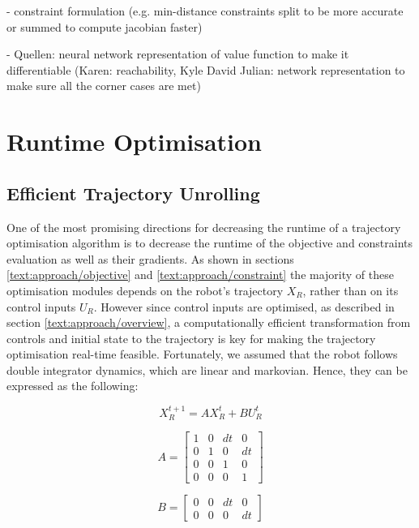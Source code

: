 - constraint formulation (e.g. min-distance constraints split to be more accurate or summed to compute jacobian faster)

- Quellen: neural network representation of value function to make it differentiable (Karen: reachability, Kyle David Julian: network representation to make sure all the corner cases are met)

\section{Runtime Optimisation}
\label{text:approach/runtime}

\subsection{Efficient Trajectory Unrolling}
\label{text:approach/runtime/unrolling}
One of the most promising directions for decreasing the runtime of a trajectory optimisation algorithm is to decrease the runtime of the objective and constraints evaluation as well as their gradients. As shown in sections \ref{text:approach/objective} and \ref{text:approach/constraint} the majority of these optimisation modules depends on the robot's trajectory $X_R$, rather than on its control inputs $U_R$. However since control inputs are optimised, as described in section \ref{text:approach/overview}, a computationally efficient transformation from controls and initial state to the trajectory is key for making the trajectory optimisation real-time feasible.
\newline
Fortunately, we assumed that the robot follows double integrator dynamics, which are linear and markovian. Hence, they can be expressed as the following: 

\begin{equation}
X_R^{t+1} = A X_R^t + B U_R^t
\label{eq:dynamics}
\end{equation}

\begin{minipage}{0.5\textwidth}
$$A = \begin{bmatrix} 1 & 0 & dt & 0 \\ 0 & 1 & 0 & dt \\ 0 & 0 & 1 & 0 \\ 0 & 0 & 0 & 1\end{bmatrix}$$
\end{minipage}
\begin{minipage}{0.5\textwidth}
$$B = \begin{bmatrix} 0 & 0 & dt & 0 \\ 0 & 0 & 0 & dt \end{bmatrix}$$
\end{minipage}

